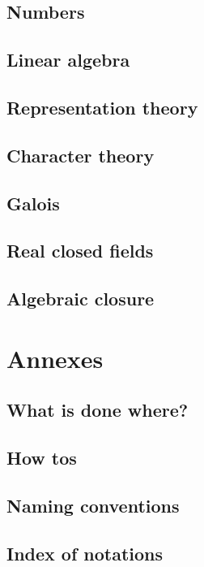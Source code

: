 \documentclass{book}
\begin{document}
\chapter{Numbers}

\chapter{Linear algebra}

\chapter{Representation theory}

\chapter{Character theory}

\chapter{Galois}

\chapter{Real closed fields}

\chapter{Algebraic closure}

\part{Annexes}

\chapter{What is done where?}

\chapter{How tos}

\chapter{Naming conventions}

\chapter{Index of notations}
\end{document}
